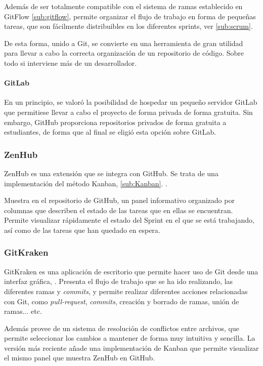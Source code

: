 Además de ser totalmente compatible con el sistema de ramas establecido en GitFlow \ref{sub:gitflow}, permite organizar el flujo de trabajo en forma de pequeñas tareas, que son fácilmente distribuibles en los diferentes sprints, ver \ref{sub:scrum}. 

De esta forma, unido a Git, se convierte en una herramienta de gran utilidad para llevar a cabo la correcta organización de un repositorio de código. Sobre todo si interviene más de un desarrollador. 

\paragraph{GitLab}
En un principio, se valoró la posibilidad de hospedar un pequeño servidor GitLab que permitiese llevar a cabo el proyecto de forma privada de forma gratuita. Sin embargo, GitHub proporciona repositorios privados de forma gratuita a estudiantes, de forma que al final se eligió esta opción sobre GitLab.

\subsubsection{ZenHub}

ZenHub es una extensión que se integra con GitHub. Se trata de una implementación del método Kanban, \ref{sub:Kanban}. \citep{wiki:ZenHub}.

Muestra en el repositorio de GitHub, un panel informativo organizado por columnas que describen el estado de las tareas que en ellas se encuentran. 
Permite visualizar rápidamente el estado del Sprint en el que se está trabajando, así como de las tareas que han quedado en espera.

\subsubsection{GitKraken}

GitKraken es una aplicación de escritorio que permite hacer uso de Git desde una interfaz gráfica, \citep{wiki:GitKraken}. Presenta el flujo de trabajo que se ha ido realizando, las diferentes ramas y \emph{commits}, y permite realizar diferentes acciones relacionadas con Git, como \emph{pull-request}, \emph{commits}, creación y borrado de ramas, unión de ramas... etc.

Además provee de un sistema de resolución de conflictos entre archivos, que permite seleccionar los cambios a mantener de forma muy intuitiva y sencilla. 
La versión más reciente añade una implementación de Kanban que permite visualizar el mismo panel que muestra ZenHub en GitHub.

